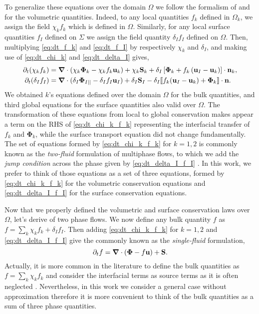 To generalize these equations over the domain $\Omega$ we follow the formalism of \citet{drew1983mathematical,marle1982macroscopic} and \citet{kataoka1986local} for the volumetric quantities.
Indeed, to any local quantities $f_k$ defined in $\Omega_k$, we assign the field $\chi_k f_k$ which is defined in $\Omega$. 
Similarly, for any local surface quantities $f_I$ defined on $\Sigma$ we assign the field quantity $\delta_I f_I$ defined on $\Omega$. 
Then, multiplying \ref{eq:dt_f_k} and \ref{eq:dt_f_I} by respectively $\chi_k$ and $\delta_I$, and making use of \ref{eq:dt_chi_k} and \ref{eq:dt_delta_I} gives, 
\begin{align}
    \partial_t (\chi_k f_k)
    &= \bm{\nabla} \cdot (\chi_k \bm{\Phi}_k - \chi_k f_k \textbf{u}_k)
    + \chi_k \textbf{S}_k
    + \delta_I\left[
        \bm{\Phi}_k
        + f_k
        \left(
            \textbf{u}_I
            - \textbf{u}_k
        \right)
    \right]
    \cdot \textbf{n}_k ,
    \label{eq:dt_chi_k_f_k}\\
    \partial_t (\delta_If_I)  
    &= 
    \bm{\nabla} \cdot (\delta_I \mathbf{\Phi}_{I||} - \delta_I f_I \textbf{u}_I)
    +\delta_I\textbf{S}_I 
    - \delta_I \llbracket 
    f_k (\textbf{u}_I - \textbf{u}_k)
    + \mathbf{\Phi}_k
     \rrbracket \cdot \textbf{n}.
    \label{eq:dt_delta_I_f_I}
\end{align}
We obtained $k$'s equations defined over the domain $\Omega$ for the bulk quantities, and third global equations for the surface quantities also valid over $\Omega$. 
The transformation of these equations from local to global conservation makes appear a term on the RHS of \ref{eq:dt_chi_k_f_k} representing the interfacial transfer of $f_k$ and $\mathbf{\Phi}_k$, while the surface transport equation did not change fundamentally. 
The set of equations formed by \ref{eq:dt_chi_k_f_k} for $k =1,2$ is commonly known as the \textit{two-fluid} formulation of multiphase flows, to which we add the \textit{jump condition} across the phase given by \ref{eq:dt_delta_I_f_I} \citep{morel2015mathematical,tryggvason2011direct,drew1983mathematical,kataoka1986local}. 
In this work, we prefer to think of those equations as a set of three equations, formed by \ref{eq:dt_chi_k_f_k} for the volumetric conservation equations and \ref{eq:dt_delta_I_f_I} for the surface conservation equations. 

Now that we properly defined the volumetric and surface conservation laws over $\Omega$, let's derive of two phase flows.
We now define any bulk quantity $f$ as $f = \sum_k \chi_k f_k + \delta_I f_I$.
Then adding \ref{eq:dt_chi_k_f_k} for $k=1,2$ and \ref{eq:dt_delta_I_f_I} give the commonly known as the \textit{single-fluid} formulation,
\begin{equation}
    \partial_t f
    = \bm{\nabla} \cdot (\bm{\Phi} - f \textbf{u})
    + \textbf{S}.
    \label{eq:dt_f}
\end{equation}
Actually, it is more common in the literature to define the bulk quantities as $f = \sum_k \chi_k f_k$ and consider the interfacial terms as source terms as it is often neglected \citep{morel2015mathematical,tryggvason2011direct}. 
Nevertheless, in this work we consider a general case without approximation therefore it is more convenient to think of the bulk quantities as a sum of three phase quantities. 
